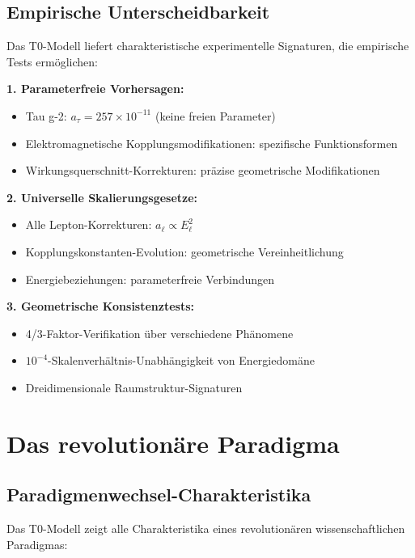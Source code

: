 \documentclass[12pt,a4paper]{report}
\begin{document}
	\subsection{Empirische Unterscheidbarkeit}
	\label{subsec:empirical_distinguishability}
	
	Das T0-Modell liefert charakteristische experimentelle Signaturen, die empirische Tests ermöglichen:
	
	\textbf{1. Parameterfreie Vorhersagen:}
	\begin{itemize}
		\item Tau g-2: $a_\tau = 257 \times 10^{-11}$ (keine freien Parameter)
		\item Elektromagnetische Kopplungsmodifikationen: spezifische Funktionsformen
		\item Wirkungsquerschnitt-Korrekturen: präzise geometrische Modifikationen
	\end{itemize}
	
	\textbf{2. Universelle Skalierungsgesetze:}
	\begin{itemize}
		\item Alle Lepton-Korrekturen: $a_\ell \propto E_\ell^2$
		\item Kopplungskonstanten-Evolution: geometrische Vereinheitlichung
		\item Energiebeziehungen: parameterfreie Verbindungen
	\end{itemize}
	
	\textbf{3. Geometrische Konsistenztests:}
	\begin{itemize}
		\item 4/3-Faktor-Verifikation über verschiedene Phänomene
		\item $10^{-4}$-Skalenverhältnis-Unabhängigkeit von Energiedomäne
		\item Dreidimensionale Raumstruktur-Signaturen
	\end{itemize}
	
	\section{Das revolutionäre Paradigma}
	\label{sec:revolutionary_paradigm}
	
	\subsection{Paradigmenwechsel-Charakteristika}
	\label{subsec:paradigm_shift_characteristics}
	
	Das T0-Modell zeigt alle Charakteristika eines revolutionären wissenschaftlichen Paradigmas:
	
\end{document}
